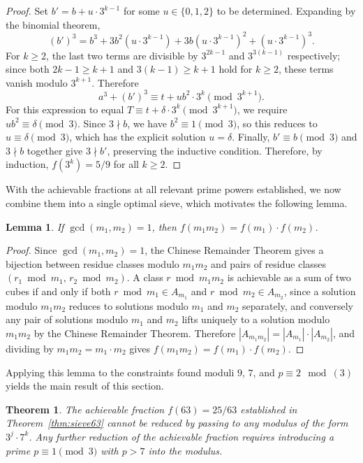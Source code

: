 \documentclass[12pt]{amsart}
\newtheorem{theorem}{Theorem}
\newtheorem{lemma}{Lemma}
\theoremstyle{definition}
\theoremstyle{remark}
\begin{document}
\begin{proof}
Set $b' = b + u \cdot 3^{k-1}$ for some $u \in \{0,1,2\}$ to be
determined. Expanding by the binomial theorem,
\[
(b')^3 = b^3 + 3b^2(u \cdot 3^{k-1}) + 3b(u \cdot 3^{k-1})^2
+ (u \cdot 3^{k-1})^3.
\]
For $k \ge 2$, the last two terms are divisible by $3^{2k-1}$ and
$3^{3(k-1)}$ respectively; since both $2k-1 \ge k+1$ and
$3(k-1) \ge k+1$ hold for $k \ge 2$, these terms vanish modulo
$3^{k+1}$. Therefore
\[
a^3 + (b')^3 \equiv t + u b^2 \cdot 3^k \pmod{3^{k+1}}.
\]
For this expression to equal $T \equiv t + \delta \cdot 3^k
\pmod{3^{k+1}}$, we require $u b^2 \equiv \delta \pmod{3}$. Since
$3 \nmid b$, we have $b^2 \equiv 1 \pmod{3}$, so this reduces to
$u \equiv \delta \pmod{3}$, which has the explicit solution $u = \delta$.
Finally, $b' \equiv b \pmod{3}$ and $3 \nmid b$ together give
$3 \nmid b'$, preserving the inductive condition. Therefore, by induction,
$f(3^k) = 5/9$ for all $k \ge 2$.
\end{proof}

With the achievable fractions at all relevant prime powers established,
we now combine them into a single optimal sieve, which motivates the following lemma. 

\begin{lemma}\label{lem:f-multiplicative}
If $\gcd(m_1, m_2) = 1$, then $f(m_1 m_2) = f(m_1) \cdot f(m_2)$.
\end{lemma}

\begin{proof}
Since $\gcd(m_1, m_2) = 1$, the Chinese Remainder Theorem gives a 
bijection between residue classes modulo $m_1 m_2$ and pairs of 
residue classes $(r_1 \bmod m_1,\, r_2 \bmod m_2)$. A class 
$r \bmod m_1 m_2$ is achievable as a sum of two cubes if and only if 
both $r \bmod m_1 \in A_{m_1}$ and $r \bmod m_2 \in A_{m_2}$, since 
a solution modulo $m_1 m_2$ reduces to solutions modulo $m_1$ and 
$m_2$ separately, and conversely any pair of solutions modulo $m_1$ 
and $m_2$ lifts uniquely to a solution modulo $m_1 m_2$ by the Chinese 
Remainder Theorem. Therefore $|A_{m_1 m_2}| = |A_{m_1}| \cdot 
|A_{m_2}|$, and dividing by $m_1 m_2 = m_1 \cdot m_2$ gives 
$f(m_1 m_2) = f(m_1) \cdot f(m_2)$.
\end{proof}

Applying this lemma to the constraints found moduli $9$, $7$, and $p \equiv 2 \mod(3) $ yields the main result of this section.

\begin{theorem}\label{thm:mod63}
The achievable fraction $f(63) = 25/63$ established in 
Theorem~\ref{thm:sieve63} cannot be reduced by passing to any modulus 
of the form $3^j \cdot 7^k$. Any further reduction of the achievable 
fraction requires introducing a prime $p \equiv 1 \pmod{3}$ with 
$p > 7$ into the modulus.
\end{theorem}
\end{document}
